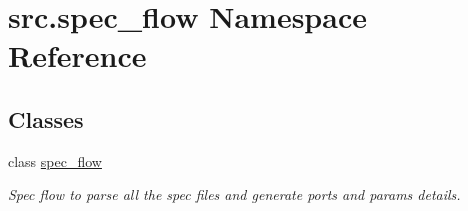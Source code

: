 \hypertarget{namespacesrc_1_1spec__flow}{\section{src.\-spec\-\_\-flow Namespace Reference}
\label{namespacesrc_1_1spec__flow}
}
\subsection*{Classes}
\begin{DoxyCompactItemize}
\item 
class \hyperlink{classsrc_1_1spec__flow_1_1spec__flow}{spec\-\_\-flow}
\begin{DoxyCompactList}\small\item\em Spec flow to parse all the spec files and generate ports and params details. \end{DoxyCompactList}\end{DoxyCompactItemize}
